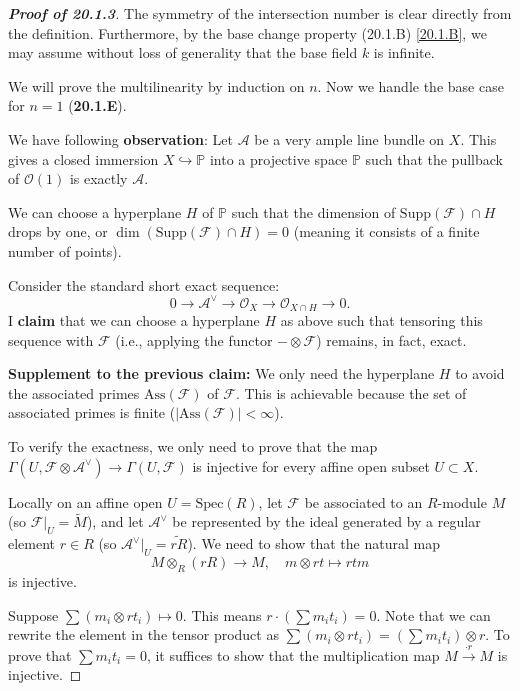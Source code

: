 \begin{proof}[\textbf{Proof of 20.1.3}]
The symmetry of the intersection number is clear directly from the definition. Furthermore, by the base change property (20.1.B) \ref{20.1.B}, we may assume without loss of generality that the base field $k$ is infinite. 

We will prove the multilinearity by induction on $n$. 
Now we handle the base case for $n=1$ (\textbf{20.1.E}).


We have following \textbf{observation}:
Let $\mathcal{A}$ be a very ample line bundle on $X$. This gives a closed immersion $X \hookrightarrow \mathbb{P}$ into a projective space $\mathbb{P}$ such that the pullback of $\mathcal{O}(1)$ is exactly $\mathcal{A}$. 

We can choose a hyperplane $H$ of $\mathbb{P}$ such that the dimension of $\text{Supp}(\mathcal{F}) \cap H$ drops by one, or $\dim(\text{Supp}(\mathcal{F}) \cap H) = 0$ (meaning it consists of a finite number of points).

Consider the standard short exact sequence:
\[
0 \to \mathcal{A}^\vee \to \mathcal{O}_X \to \mathcal{O}_{X \cap H} \to 0.
\]
I \textbf{claim} that we can choose a hyperplane $H$ as above such that tensoring this sequence with $\mathcal{F}$ (i.e., applying the functor $- \otimes \mathcal{F}$) remains, in fact, exact.



\textbf{Supplement to the previous claim:} We only need the hyperplane $H$ to avoid the associated primes $\text{Ass}(\mathcal{F})$ of $\mathcal{F}$. This is achievable because the set of associated primes is finite ($|\text{Ass}(\mathcal{F})| < \infty$).

To verify the exactness, we only need to prove that the map $\Gamma(U, \mathcal{F} \otimes \mathcal{A}^\vee) \to \Gamma(U, \mathcal{F})$ is injective for every affine open subset $U \subset X$.

Locally on an affine open $U = \text{Spec}(R)$, let $\mathcal{F}$ be associated to an $R$-module $M$ (so $\mathcal{F}|_U = \widetilde{M}$), and let $\mathcal{A}^\vee$ be represented by the ideal generated by a regular element $r \in R$ (so $\mathcal{A}^\vee|_U = \widetilde{rR}$). We need to show that the natural map
\[
M \otimes_R (rR) \longrightarrow M, \quad m \otimes rt \longmapsto rtm
\]
is injective.

Suppose $\sum (m_i \otimes rt_i) \mapsto 0$. This means $r \cdot (\sum m_i t_i) = 0$. Note that we can rewrite the element in the tensor product as $\sum (m_i \otimes rt_i) = (\sum m_i t_i) \otimes r$. To prove that $\sum m_i t_i = 0$, it suffices to show that the multiplication map $M \xrightarrow{\cdot r} M$ is injective.


\end{proof}
